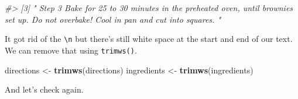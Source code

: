 \documentclass[
  12pt,
]{book}
\newenvironment{Shaded}{\begin{snugshade}}{\end{snugshade}}
\newcommand{\CommentTok}[1]{\textcolor[rgb]{0.37,0.37,0.37}{\textit{#1}}}
\newcommand{\KeywordTok}[1]{\textcolor[rgb]{0.27,0.27,0.27}{\textbf{#1}}}
\newcommand{\NormalTok}[1]{#1}
\newcommand{\StringTok}[1]{\textcolor[rgb]{0.5,0.5,0.5}{#1}}
\begin{document}
\begin{Shaded}
\begin{Highlighting}[]
\CommentTok{\#\textgreater{} [3] "                                                                                                                                            Step 3                                                                                                                                                                                                                  Bake for 25 to 30 minutes in the preheated oven, until brownies set up. Do not overbake! Cool in pan and cut into squares.                                                                                                                                        "}
\end{Highlighting}
\end{Shaded}

It got rid of the \texttt{\textbackslash{}n} but there's still white space at the start and end of our text. We can remove that using \texttt{trimws()}.

\begin{Shaded}
\begin{Highlighting}[]
\NormalTok{directions \textless{}{-}}\StringTok{ }\KeywordTok{trimws}\NormalTok{(directions)}
\NormalTok{ingredients \textless{}{-}}\StringTok{ }\KeywordTok{trimws}\NormalTok{(ingredients)}
\end{Highlighting}
\end{Shaded}

And let's check again.
\end{document}
